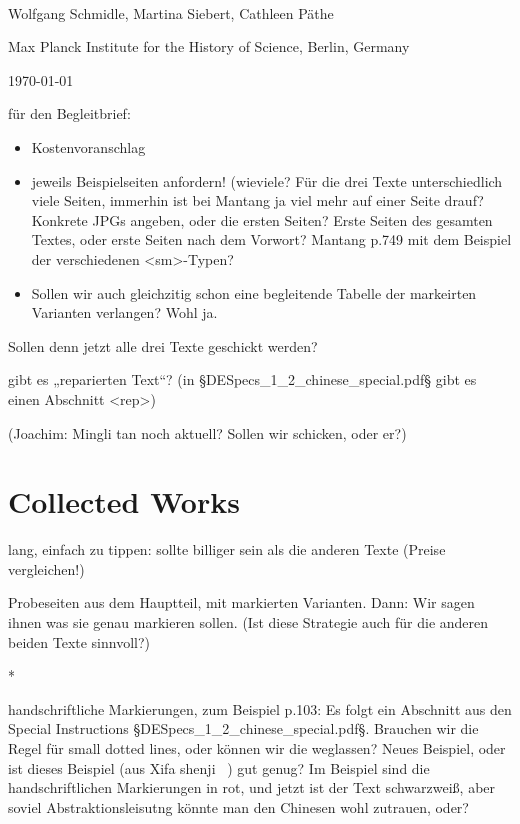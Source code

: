 \documentclass[fontsize=11pt, paper=a4, 
DIV15,
headings=normal,
parskip=half-, 
numbers=noenddot]{scrartcl}
\newcommand{\chin}[1]{{\fontspec{Sun-ExtA}{#1}}}
\begin{document}
\begin{center}
{} \\[5mm]
\large Wolfgang Schmidle, Martina Siebert, Cathleen Päthe

\normalsize Max Planck Institute for the History of Science, Berlin, Germany

\today
\end{center}



für den Begleitbrief:

\begin{itemize}
\item Kostenvoranschlag
\item jeweils Beispielseiten anfordern! (wieviele? Für die drei Texte unterschiedlich viele Seiten, immerhin ist bei Mantang ja viel mehr auf einer Seite drauf? Konkrete JPGs angeben, oder die ersten Seiten? Erste Seiten des gesamten Textes, oder erste Seiten nach dem Vorwort? Mantang p.749 mit dem Beispiel der verschiedenen <sm>-Typen?
\item Sollen wir auch gleichzitig schon eine begleitende Tabelle der markeirten Varianten verlangen? Wohl ja.
\end{itemize}

Sollen denn jetzt alle drei Texte geschickt werden?

gibt es „reparierten Text“? (in §DESpecs_1_2_chinese_special.pdf§ gibt es einen Abschnitt <rep>)

(Joachim: Mingli tan noch aktuell? Sollen wir schicken, oder er?)

\section{Collected Works}

lang, einfach zu tippen: sollte billiger sein als die anderen Texte (Preise vergleichen!)

Probeseiten aus dem Hauptteil, mit markierten Varianten. Dann: Wir sagen ihnen was sie genau markieren sollen. (Ist diese Strategie auch für die anderen beiden Texte sinnvoll?)

*

handschriftliche Markierungen, zum Beispiel p.103: Es folgt ein Abschnitt aus den Special Instructions §DESpecs_1_2_chinese_special.pdf§. Brauchen wir die Regel für small dotted lines, oder können wir die weglassen? Neues Beispiel, oder ist dieses Beispiel (aus Xifa shenji \, \chin{西法神機}) gut genug? Im Beispiel sind die handschriftlichen Markierungen in rot, und jetzt ist der Text schwarzweiß, aber soviel Abstraktionsleisutng könnte man den Chinesen wohl zutrauen, oder?
\end{document}
